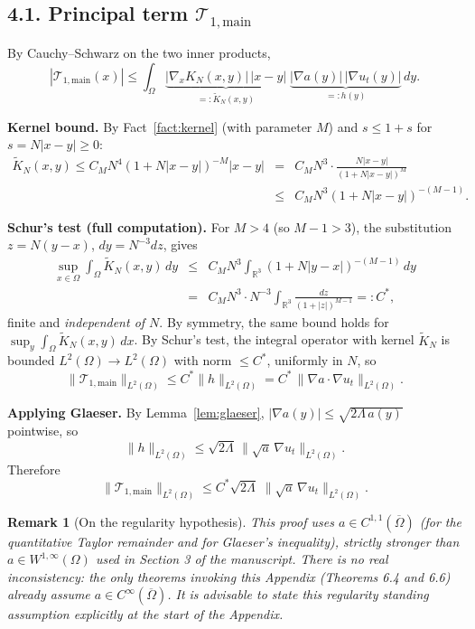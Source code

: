 \documentclass[11pt,letterpaper]{amsart}
\newtheorem{remark}[theorem]{Remark}
\begin{document}
\subsection*{4.1. Principal term $\mathcal{T}_{1,\mathrm{main}}$}

By Cauchy--Schwarz on the two inner products,
\[
|\mathcal{T}_{1,\mathrm{main}}(x)| \le \int_\Omega \underbrace{|\nabla_x K_N(x,y)|\,|x-y|}_{=:\widetilde K_N(x,y)} \;\underbrace{|\nabla a(y)|\,|\nabla u_t(y)|}_{=:h(y)} \, dy.
\]

\noindent\textbf{Kernel bound.} By Fact~\ref{fact:kernel} (with parameter $M$) and $s \le 1+s$ for $s = N|x-y| \ge 0$:
\begin{eqnarray*}
\widetilde K_N(x,y) \le C_M N^4(1+N|x-y|)^{-M}|x-y|
&=& C_M N^3 \cdot \frac{N|x-y|}{(1+N|x-y|)^M}\\
&\le& C_M N^3 (1+N|x-y|)^{-(M-1)}.
\end{eqnarray*}

\noindent\textbf{Schur's test (full computation).} For $M > 4$ (so $M-1>3$), the substitution $z = N(y-x)$, $dy = N^{-3}dz$, gives
\begin{eqnarray*}
\sup_{x\in\Omega} \int_\Omega \widetilde K_N(x,y)\,dy
&\le& C_M N^3 \int_{\mathbb{R}^3} (1+N|y-x|)^{-(M-1)}\,dy\\
&=& C_M N^3 \cdot N^{-3} \int_{\mathbb{R}^3} \frac{dz}{(1+|z|)^{M-1}}
=: C^*,
\end{eqnarray*}
finite and \emph{independent of $N$}. By symmetry, the same bound holds for $\sup_{y}\int_\Omega \widetilde K_N(x,y)\,dx$. By Schur's test, the integral operator with kernel $\widetilde K_N$ is bounded $L^2(\Omega) \to L^2(\Omega)$ with norm $\le C^*$, uniformly in $N$, so
\[
\|\mathcal{T}_{1,\mathrm{main}}\|_{L^2(\Omega)} \le C^* \|h\|_{L^2(\Omega)} = C^*\,\|\nabla a \cdot \nabla u_t\|_{L^2(\Omega)}.
\]

\noindent\textbf{Applying Glaeser.} By Lemma~\ref{lem:glaeser}, $|\nabla a(y)| \le \sqrt{2\Lambda\,a(y)}$ pointwise, so
\[
\|h\|_{L^2(\Omega)} \le \sqrt{2\Lambda}\,\|\sqrt{a}\,\nabla u_t\|_{L^2(\Omega)}.
\]
Therefore
\begin{equation}\label{eq:Tmain-final}
\boxed{\;\|\mathcal{T}_{1,\mathrm{main}}\|_{L^2(\Omega)} \le C^*\sqrt{2\Lambda}\;\|\sqrt{a}\,\nabla u_t\|_{L^2(\Omega)}.\;}
\end{equation}


\begin{remark}[On the regularity hypothesis]
This proof uses $a \in C^{1,1}(\overline\Omega)$ (for the quantitative Taylor remainder and for Glaeser's inequality), strictly stronger than $a \in W^{1,\infty}(\Omega)$ used in Section 3 of the manuscript. There is no real inconsistency: the only theorems invoking this Appendix (Theorems 6.4 and 6.6) already assume $a \in C^\infty(\overline\Omega)$. It is advisable to state this regularity standing assumption explicitly at the start of the Appendix.
\end{remark}
\end{document}
